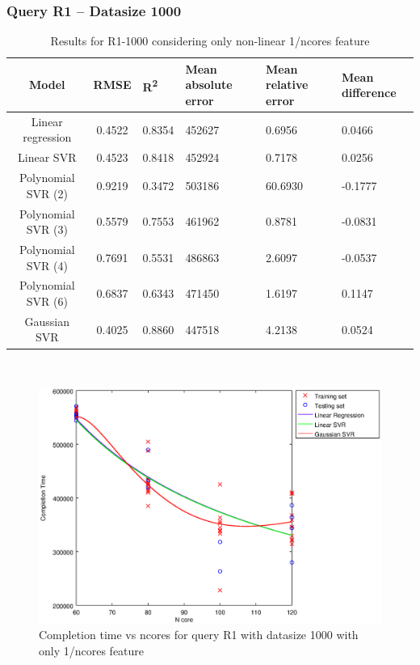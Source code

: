 \documentclass[a4paper,11pt]{article}
\begin{document}
\newpage
\subsubsection{Query R1 -- Datasize 1000}
\begin{table}[H]
	\centering
	\begin{adjustbox}{center}
		\begin{tabular}{c | c M{1.2cm} M{2.5cm} M{2.5cm} M{1.8cm}}
			Model & RMSE & R\textsuperscript{2} & Mean absolute error & Mean relative error & Mean difference \tabularnewline
			\hline
			Linear regression & 0.4522 & 0.8354 & 452627 & 0.6956 & 0.0466 \\
			Linear SVR & 0.4523 & 0.8418 & 452924 & 0.7178 & 0.0256 \\
			Polynomial SVR (2) & 0.9219 & 0.3472 & 503186 & 60.6930 & -0.1777 \\
			Polynomial SVR (3) & 0.5579 & 0.7553 & 461962 & 0.8781 & -0.0831 \\
			Polynomial SVR (4) & 0.7691 & 0.5531 & 486863 & 2.6097 & -0.0537 \\
			Polynomial SVR (6) & 0.6837 & 0.6343 & 471450 & 1.6197 & 0.1147 \\
			Gaussian SVR & 0.4025 & 0.8860 & 447518 & 4.2138 & 0.0524 \\
		\end{tabular}
	\end{adjustbox}
	\\
	\caption{Results for R1-1000 considering only non-linear 1/ncores feature}
	\label{table_R1_prediction_all}
\end{table}

\begin {figure}[hbtp]
\centering
\includegraphics[width=\textwidth]{output/R1_1000_ONLY_1_OVER_NCORES/plot_R1_1000_bestmodels.eps}
\caption {Completion time vs ncores for query R1 with datasize 1000 with only 1/ncores feature}
\end {figure}
\end{document}

